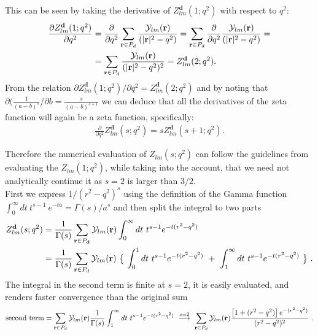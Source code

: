 \documentclass[a4paper,12pt]{book}
\begin{document}
This can be seen by taking the derivative of $Z_{lm}^{\mathbf{d}}(1;q^2)$ with respect to $q^2$:
\begin{align}
\frac{\partial Z_{lm}^{\mathbf{d}}(1;q^2)}{\partial q^2} &= \frac{\partial}{\partial q^2} \sum_{\mathbf{r}\in P_{d}} \frac{{\cal Y}_{lm}(\mathbf{r})}{(|\mathbf{r}|^2-q^2)}= \sum_{\mathbf{r}\in P_{d}} \frac{\partial}{\partial q^2} \frac{{\cal Y}_{lm}(\mathbf{r})}{(|\mathbf{r}|^2-q^2)}=\\
&=\sum_{\mathbf{r}\in P_{d}} \frac{{\cal Y}_{lm}(\mathbf{r})}{(|\mathbf{r}|^2-q^2)^2}= Z_{lm}^{\mathbf{d}}(2;q^2).
\end{align}
From the relation $ \partial Z_{lm}^{\mathbf{d}}(1;q^2)/ \partial q^2 = Z_{lm}^{\mathbf{d}}(2;q^2)$ and by noting that $\partial (\frac{1}{(a-b)^s}/\partial b = \frac{s}{(a-b)^{s+1}}$ we can deduce that all the derivatives of the zeta function will again be a zeta function, specifically:
\begin{align}
\frac{\partial}{\partial q^2} Z_{lm}^{\mathbf{d}}(s;q^2) = s Z_{lm}^{\mathbf{d}}(s+1;q^2).
\end{align} 

Therefore the numerical evaluation of $Z_{lm}(s;q^2)$ can follow the guidelines from evaluating the $Z_{lm}(1;q^2)$, while taking into the account, that we need not analytically continue it as $s = 2$ is larger than $3/2$.\\

First we express $1/(r^2-q^2)^s$ using the definition of the Gamma function $\int_0^\infty dt~ t^{s-1}~e^{-ta}=\Gamma(s)/a^s$ and then split the integral to two parts
\begin{align}
Z_{lm}^{\mathbf{d}}(s;q^2)&= \frac{1}{\Gamma(s)}\sum_{\mathbf{r}\in P_{\mathbf{d}}} {\cal Y}_{lm}(\mathbf{r}) \int _0^\infty dt~t^{s-1} e^{-t(r^2-q^2)} \nonumber \\
&=\frac{1}{\Gamma(s)}\sum_{\mathbf{r}\in P_{d}} {\cal Y}_{lm}(\mathbf{r})~\bigl\{~\int _0^1 dt~t^{s-1} e^{-t(r^2-q^2)}~+~\int _1^\infty dt~t^{s-1} e^{-t(r^2-q^2)}~\bigr\}\ .
\end{align}
The integral in the second term is finite at $s=2$, it is easily evaluated, and renders faster convergence than the original sum 
\begin{equation}
\mathrm{second\ term}=\sum_{\mathbf{r}\in P_{d}} {\cal Y}_{lm}(\mathbf{r}) \frac{1}{\Gamma(s)} \int _1^\infty dt~t^{s-1} e^{-t(r^2-q^2)} \ \stackrel {s=2}{ \longrightarrow} ~\sum_{\mathbf{r}\in P_{d}} {\cal Y}_{lm}(\mathbf{r}) \frac{\left[ 1 + (r^2 - q^2) \right] e^{-(r^2-q^2)}}{(r^2-q^2)^2}\ .
\end{equation}
\end{document}
